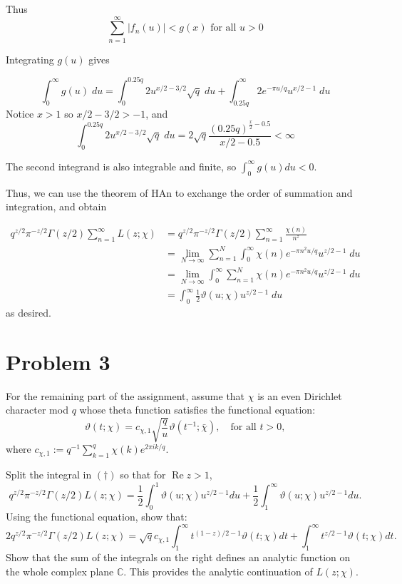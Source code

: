 \documentclass{article}
\theoremstyle{definition}
\theoremstyle{definition}
\theoremstyle{remark}
\renewcommand{\t}{\vartheta}
\newcommand{\x}{\chi}
\begin{document}
Thus 
$$
\sum_{n=1}^{\infty} |f_n(u)| < g(x) \text{ for all } u > 0
$$

Integrating $g(u)$ gives 

\begin{dmath}
\int_0^{\infty} g(u) \;du = \int_0^{0.25q} 2 u^{x/2 - 3/2}\sqrt{q} \;du + \int_{0.25q}^{\infty} 2e^{-\pi u / q} u^{x/2 - 1} \;du
\end{dmath}
Notice $x > 1$ so $x/2 - 3/2 > -1$, and
$$
\int_0^{0.25q} 2 u^{x/2 - 3/2}\sqrt{q} \;du  = 2 \sqrt{q} \frac{(0.25q)^{\frac{x}{2} - 0.5}}{x/2 - 0.5} < \infty
$$

The second integrand is also integrable and finite, so $\int_0^{\infty}g(u)du < 0$.

Thus, we can use the theorem of HAn to exchange the order of summation and integration, and obtain

\begin{align}
	q^{z/2}\pi^{-z/2}\Gamma(z/2)  \sum_{n=1}^{\infty} L(z; \x) 
	&=q^{z/2}\pi^{-z/2}\Gamma(z/2)  \sum_{n=1}^{\infty} \frac{\x(n)}{n^z} \\
	&= \lim_{N \rightarrow \infty}\sum_{n=1}^{N} \int_{0}^{\infty} \chi(n)e^{-\pi n^2 u/q} u^{z/2-1} \;du \\
	&= \lim_{N \rightarrow \infty} \int_{0}^{\infty}\sum_{n=1}^{N} \chi(n)e^{-\pi n^2 u/q} u^{z/2-1} \;du \\
	&= \int_{0}^{\infty} \frac{1}{2}\t(u; \x) u^{z/2-1} \;du
\end{align}
as desired.










\newpage


\section*{Problem 3}
For the remaining part of the assignment, assume that $\chi$ is an even Dirichlet character mod $q$ whose theta function satisfies the functional equation:
\begin{equation}
	\vartheta(t;\chi) = c_{\chi,1} \sqrt{\frac{q}{u}} \vartheta(t^{-1};\bar{\chi}), \quad \text{for all } t > 0,
\end{equation}
where $c_{\chi,1} := q^{-1} \sum_{k=1}^{q} \chi(k)e^{2\pi i k/q}$.

Split the integral in $(\dagger)$ so that for $\operatorname{Re} z > 1$,
\begin{equation}\label{q3_split}
    q^{z/2}\pi^{-z/2}\Gamma(z/2)L(z;\chi) = \frac{1}{2} \int_0^1 \vartheta(u;\chi) u^{z/2-1} du + \frac{1}{2} \int_1^{\infty} \vartheta(u;\chi) u^{z/2-1} du.
\end{equation}
Using the functional equation, show that:
\begin{equation}\label{q3_part_1_goal}
    2q^{z/2}\pi^{-z/2}\Gamma(z/2)L(z;\chi) = \sqrt{q} c_{\chi,1} \int_1^{\infty} t^{(1-z)/2-1}\vartheta(t;\chi) dt + \int_1^{\infty} t^{z/2-1}\vartheta(t;\chi) dt.
\end{equation}
Show that the sum of the integrals on the right defines an analytic function on the whole complex plane $\mathbb{C}$. This provides the analytic continuation of $L(z;\chi)$.
\end{document}
